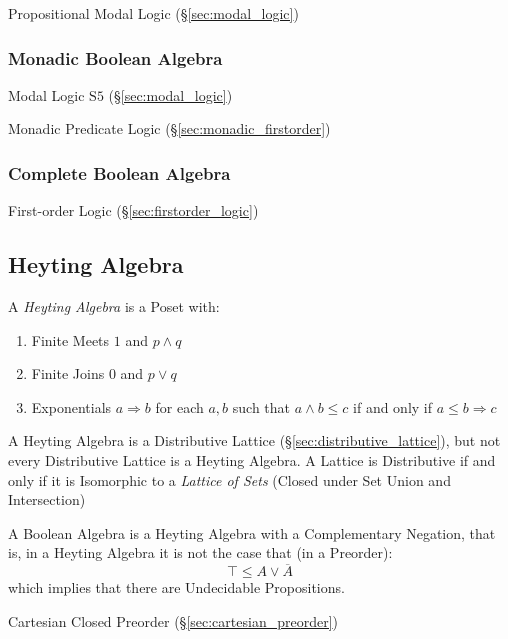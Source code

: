 Propositional Modal Logic (\S\ref{sec:modal_logic})



\subsubsection{Monadic Boolean Algebra}\label{sec:monadic_boolean}

Modal Logic $\mathrm{S5}$ (\S\ref{sec:modal_logic})

Monadic Predicate Logic (\S\ref{sec:monadic_firstorder})



\subsubsection{Complete Boolean Algebra}\label{sec:complete_boolean}

First-order Logic (\S\ref{sec:firstorder_logic})



\subsection{Heyting Algebra}\label{sec:heyting_algebra}

A \emph{Heyting Algebra} is a Poset with:
\begin{enumerate}
  \item Finite Meets $1$ and $p \wedge q$
  \item Finite Joins $0$ and $p \vee q$
  \item Exponentials $a \Rightarrow b$ for each $a,b$ such that $a
    \wedge b \leq c$ if and only if $a \leq b \Rightarrow c$
\end{enumerate}
A Heyting Algebra is a Distributive Lattice
(\S\ref{sec:distributive_lattice}), but not every Distributive Lattice
is a Heyting Algebra. A Lattice is Distributive if and only if it is Isomorphic
to a \emph{Lattice of Sets} (Closed under Set Union and Intersection)

A Boolean Algebra is a Heyting Algebra with a Complementary Negation,
that is, in a Heyting Algebra it is not the case that (in a Preorder):
\[
  \top \leq A \vee \overline{A}
\]
which implies that there are Undecidable Propositions.

Cartesian Closed Preorder (\S\ref{sec:cartesian_preorder})


